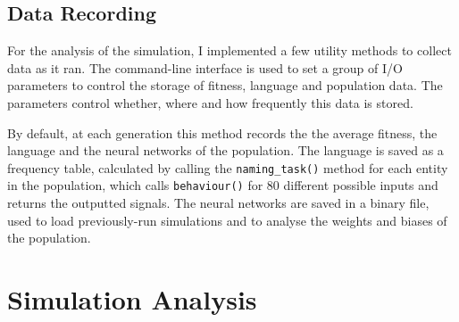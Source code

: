 \documentclass[12pt,a4paper]{report}
\begin{document}
\subsection{Data Recording}

For the analysis of the simulation, I implemented a few utility methods to collect data as it ran. The command-line interface is used to set a group of I/O parameters to control the storage of fitness, language and population data. The parameters control whether, where and how frequently this data is stored.%


By default, at each generation this method records the the average fitness, the language and the neural networks of the population. The language is saved as a frequency table, calculated by calling the \texttt{naming\_task()} method for each entity in the population, which calls \texttt{behaviour()} for 80 different possible inputs and returns the outputted signals. The neural networks are saved in a binary file, used to load previously-run simulations and to analyse the weights and biases of the population.

\section{Simulation Analysis}\label{section:impl-analysis}
\end{document}

